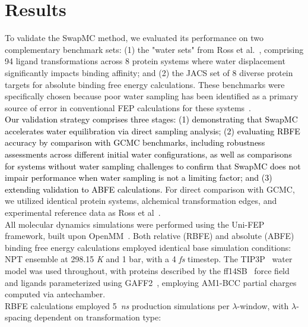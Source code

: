 \documentclass[journal=jacsat,manuscript=article]{achemso}
\newcommand*{\textred}[1]{\textcolor{black}{#1}}
\begin{document}
\section{Results}
To validate the SwapMC method, we evaluated its performance on two complementary benchmark sets: 
(1) the "water sets" from Ross et al.~\cite{ross2020enhancing}, comprising 94 ligand transformations across 8 protein systems where water displacement significantly impacts binding affinity; 
and (2) the JACS set of 8 diverse protein targets for absolute binding free energy calculations. 
These benchmarks were specifically chosen because poor water sampling has been identified as a primary source of error in conventional FEP calculations for these systems~\cite{ross2020enhancing, Liu2025, luccarelli2010effects, Ge2022}. \\
\newline
\textred{
Our validation strategy comprises three stages: 
(1) demonstrating that SwapMC accelerates water equilibration via direct sampling analysis; 
(2) evaluating RBFE accuracy by comparison with GCMC benchmarks, 
including robustness assessments across different initial water configurations, 
as well as comparisons for systems without water sampling challenges to confirm 
that SwapMC does not impair performance when water sampling is not a limiting factor; 
and 
(3) extending validation to ABFE calculations.
}
For direct comparison with GCMC, we utilized identical protein systems, alchemical transformation edges, and experimental reference data as Ross et al~\cite{ross2020enhancing}. \\
\newline
All molecular dynamics simulations were performed using the Uni-FEP framework, built upon OpenMM~\cite{Eastman2023}. 
Both relative (RBFE) and absolute (ABFE) binding free energy calculations employed identical base simulation conditions: NPT ensemble at 298.15 \textit{K} and 1 bar, with a 4 \textit{fs} timestep.
The TIP3P~\cite{Jorgensen1983} water model was used throughout, with proteins described by the ff14SB~\cite{Maier2015} force field and ligands parameterized using GAFF2~\cite{he2020fast}, 
employing AM1-BCC partial charges computed via antechamber. \\
\newline
RBFE calculations employed 5~\textit{ns} production simulations per $\lambda$-window, with $\lambda$-spacing dependent on transformation type: 
\end{document}
